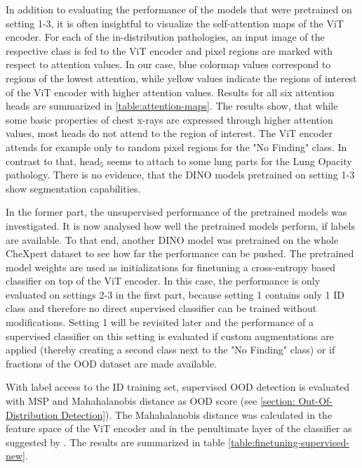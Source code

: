 \par
In addition to evaluating the performance of the models that were pretrained on setting 1-3, it is often insightful to visualize the self-attention maps of the ViT encoder.
For each of the in-distribution pathologies, an input image of the respective class is fed to the ViT encoder and pixel regions are marked with respect to attention values.
In our case, blue colormap values correspond to regions of the lowest attention, while yellow values indicate the regions of interest of the ViT encoder with higher attention values.
Results for all six attention heads are summarized in \ref{table:attention-maps}.
The results show, that while some basic properties of chest x-rays are expressed through higher attention values, most heads do not attend to the region of interest.
The ViT encoder attends for example only to random pixel regions for the "No Finding" class.
In contrast to that, $\text{head}_5$ seems to attach to some lung parts for the Lung Opacity pathology.
There is no evidence, that the DINO models pretrained on setting 1-3 show segmentation capabilities.
\par
In the former part, the unsupervised performance of the pretrained models was investigated.
It is now analysed how well the pretrained models perform, if labels are available.
To that end, another DINO model was pretrained on the whole CheXpert dataset to see how far the performance can be pushed.
The pretrained model weights are used as initializations for finetuning a cross-entropy based classifier on top of the ViT encoder.
In this case, the performance is only evaluated on settings 2-3 in the first part, because setting 1 contains only 1 ID class and therefore no direct supervised classifier can be trained without modifications.
Setting 1 will be revisited later and the performance of a supervised classifier on this setting is evaluated if custom augmentations are applied (thereby creating a second class next to the "No Finding" class) or if fractions of the OOD dataset are made available.
\par
With label access to the ID training set, supervised OOD detection is evaluated with MSP and Mahahalanobis distance as OOD score (see \ref{section: Out-Of-Distribution Detection}).
The Mahahalanobis distance was calculated in the feature space of the ViT encoder and in the penultimate layer of the classifier as suggested by \citep{Lee2018, Michels2023}.
The results are summarized in table \ref{table:finetuning-supervised-new}.
